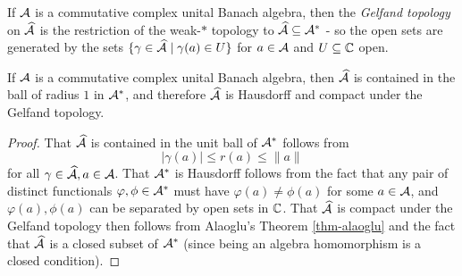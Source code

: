 \begin{defn} If $\mathcal{A}$ is a commutative complex unital Banach algebra, then the \emph{Gelfand topology} on $\widehat{\mathcal{A}}$ is the restriction of the weak-$*$ topology to $\widehat{\mathcal{A}} \subseteq \mathcal{A}^*$ - so the open sets are generated by the sets $\{\gamma \in \widehat{\mathcal{A}} \mid \gamma(a) \in U\}$ for $a \in \mathcal{A}$ and $U \subseteq \mathbb{C}$ open.
\end{defn}

\begin{prop} If $\mathcal{A}$ is a commutative complex unital Banach algebra, then $\widehat{\mathcal{A}}$ is contained in the ball of radius $1$ in $\mathcal{A}^*$, and therefore $\widehat{\mathcal{A}}$ is Hausdorff and compact under the Gelfand topology.
\end{prop}
\begin{proof} That $\widehat{\mathcal{A}}$ is contained in the unit ball of $\mathcal{A}^*$ follows from
\[
|\gamma(a)| \le r(a) \le \|a\|
\]
for all $\gamma \in \widehat{\mathcal{A}}, a \in \mathcal{A}$. That $\mathcal{A}^*$ is Hausdorff follows from the fact that any pair of distinct functionals $\varphi, \phi \in \mathcal{A}^*$ must have $\varphi(a) \ne \phi(a)$ for some $a \in \mathcal{A}$, and $\varphi(a), \phi(a)$ can be separated by open sets in $\mathbb{C}$. That $\widehat{\mathcal{A}}$ is compact under the Gelfand topology then follows from Alaoglu's Theorem \ref{thm-alaoglu} and the fact that $\widehat{\mathcal{A}}$ is a closed subset of $\mathcal{A}^*$ (since being an algebra homomorphism is a closed condition).
\end{proof}

